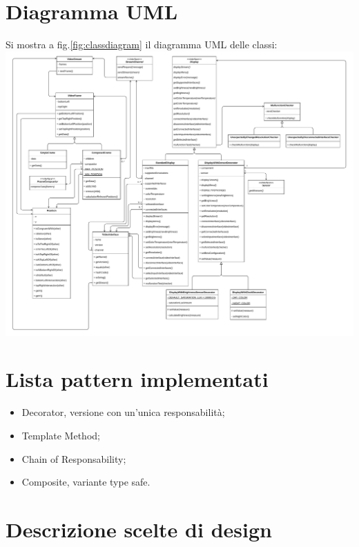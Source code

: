 \documentclass[a4paper,11pt]{article}
\begin{document}
	\section{Diagramma UML}
	Si mostra a fig.\ref{fig:classdiagram} il diagramma UML delle classi:\\
	\noindent\includegraphics[width=\textwidth]{diagramma/ClassDiagramm-NoTypes.pdf}
	\label{fig:classdiagram}
	
	\section{Lista pattern implementati}
	\begin{itemize}
		\item Decorator, versione con un'unica responsabilità;
		\item Template Method;
		\item Chain of Responsability;
		\item Composite, variante type safe.
	\end{itemize}
	\section{Descrizione scelte di design}
\end{document}
